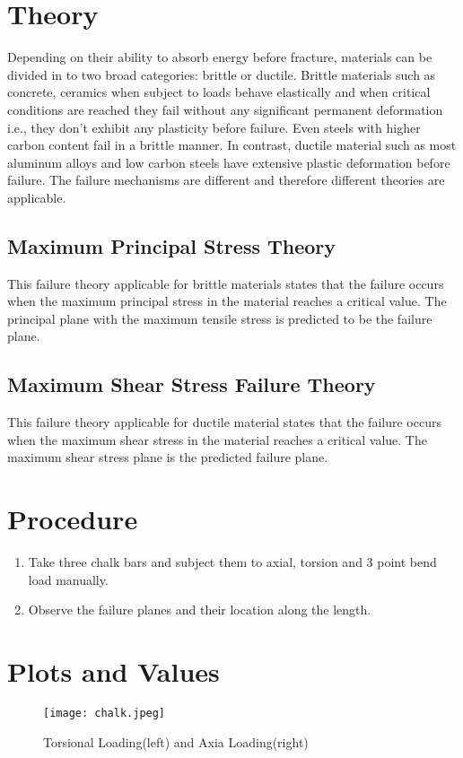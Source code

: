 \documentclass[12pt]{report}
\begin{document}
\section{Theory}
Depending on their ability to absorb energy before fracture, materials can be divided in to
two broad categories: brittle or ductile. Brittle materials such as concrete, ceramics when
subject to loads behave elastically and when critical conditions are reached they fail
without any significant permanent deformation i.e., they don’t exhibit any plasticity
before failure. Even steels with higher carbon content fail in a brittle manner. In contrast,
ductile material such as most aluminum alloys and low carbon steels have extensive
plastic deformation before failure. The failure mechanisms are different and therefore
different theories are applicable.
\subsection*{Maximum Principal Stress Theory}
This failure theory applicable for brittle materials states
that the failure occurs when the maximum principal stress in the material reaches a
critical value. The principal plane with the maximum tensile stress is predicted to be the
failure plane.
\subsection*{Maximum Shear Stress Failure Theory}
This failure theory applicable for ductile material
states that the failure occurs when the maximum shear stress in the material reaches a
critical value. The maximum shear stress plane is the predicted failure plane.

\section{Procedure}
\begin{enumerate}
    \item Take three chalk bars and subject them to axial, torsion and 3 point bend load
          manually.
    \item Observe the failure planes and their location along the length.
\end{enumerate}

\section{Plots and Values}
\begin{figure}[H]
    \centering
    \texttt{[image: chalk.jpeg]}
    \caption{Torsional Loading(left) and Axia Loading(right)}
\end{figure}
\end{document}
